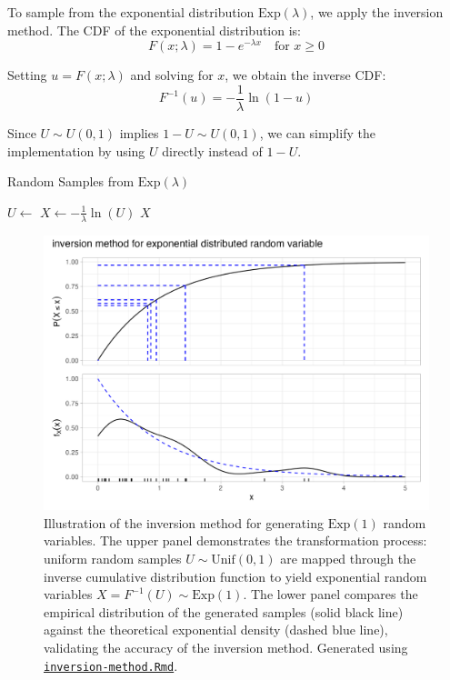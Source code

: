 \begin{example}
\label{ex:exponential-inversion}
To sample from the exponential distribution $\text{Exp}(\lambda)$, we apply the inversion method. The CDF of the exponential distribution is:
$$F(x;\lambda) = 1 - e^{-\lambda x} \quad \text{for } x \geq 0$$

Setting $u = F(x;\lambda)$ and solving for $x$, we obtain the inverse CDF:
$$F^{-1}(u) = -\frac{1}{\lambda}\ln(1-u)$$

Since $U \sim U(0,1)$ implies $1-U \sim U(0,1)$, we can simplify the implementation by using $U$ directly instead of $1-U$.

\begin{algorithm}[H]
\caption{Random Samples from $\text{Exp}(\lambda)$}
\label{algo:exponential-inversion}
\begin{algorithmic}
    \State $U \gets$  
    \State $X \gets -\frac{1}{\lambda}\ln(U)$ 
    \State \Return $X$
\end{algorithmic}
\end{algorithm}

\begin{figure}[h]
    \centering
    \includegraphics[width=.8\linewidth]{figures/inversion.png}
    \caption{Illustration of the inversion method for generating $\text{Exp}(1)$ random variables. The upper panel demonstrates the transformation process: uniform random samples $U \sim \text{Unif}(0,1)$ are mapped through the inverse cumulative distribution function to yield exponential random variables $X = F^{-1}(U) \sim \text{Exp}(1)$. The lower panel compares the empirical distribution of the generated samples (solid black line) against the theoretical exponential density (dashed blue line), validating the accuracy of the inversion method. Generated using \href{https://github.com/NikoGerman/Seminar/blob/main/Notebooks/inversion-method.Rmd}{\texttt{inversion-method.Rmd}}.}
    \label{fig:inversion-method}
\end{figure}
\end{example}


